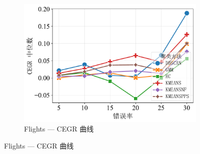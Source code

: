 \documentclass[10pt]{article} %
\numberwithin{equation}{section}
\begin{document}
\begin{figure}[htbp]
\begin{subfigure}[b]{0.33\linewidth}
    \includegraphics[width=\linewidth]{figures/6.4.3graph/CEGR_5pct_flights.pdf}
    \caption{Flights — CEGR 曲线}
    \label{fig:fl_cegr}
  \end{subfigure}


\end{figure}
\end{document}
